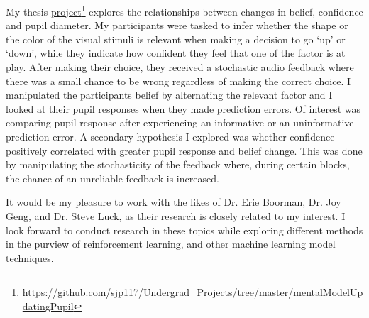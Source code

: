 \documentclass[12pt]{article}
\begin{document}
	My thesis \href{https://github.com/sjp117/Undergrad_Projects/tree/master/mentalModelUpdatingPupil}{project}\footnote{\url{https://github.com/sjp117/Undergrad\_Projects/tree/master/mentalModelUpdatingPupil}} explores the relationships between changes in belief, confidence and pupil diameter. My participants were tasked to infer whether the shape or the color of the visual stimuli is relevant when making a decision to go `up' or `down', while they indicate how confident they feel that one of the factor is at play. After making their choice, they received a stochastic audio feedback where there was a small chance to be wrong regardless of making the correct choice. I manipulated the participants belief by alternating the relevant factor and I looked at their pupil responses when they made prediction errors. Of interest was comparing pupil response after experiencing an informative or an uninformative prediction error. A secondary hypothesis I explored was whether confidence positively correlated with greater pupil response and belief change. This was done by manipulating the stochasticity of the feedback where, during certain blocks, the chance of an unreliable feedback is increased.

	It would be my pleasure to work with the likes of Dr. Erie Boorman, Dr. Joy Geng, and Dr. Steve Luck, as their research is closely related to my interest. I look forward to conduct research in these topics while exploring different methods in the purview of reinforcement learning, and other machine learning model techniques.
	
\end{document}
